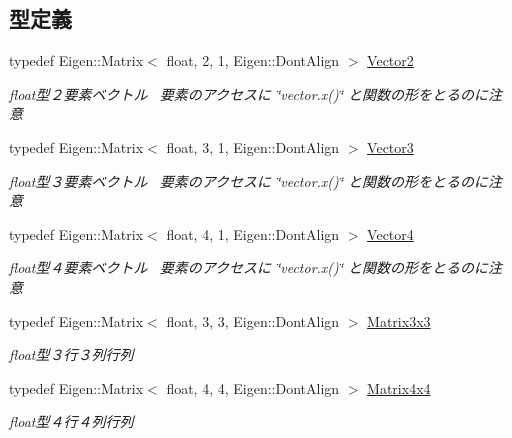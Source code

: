 \subsection*{型定義}
\begin{DoxyCompactItemize}
\item 
typedef Eigen\+::\+Matrix$<$ float, 2, 1, Eigen\+::\+Dont\+Align $>$ \mbox{\hyperlink{namespace_k___math_a41eb0c2c69c938cd59989eb3241cefb2}{Vector2}}
\begin{DoxyCompactList}\small\item\em float型２要素ベクトル~\newline
要素のアクセスに \char`\"{}vector.\+x()\char`\"{} と関数の形をとるのに注意 \end{DoxyCompactList}\item 
typedef Eigen\+::\+Matrix$<$ float, 3, 1, Eigen\+::\+Dont\+Align $>$ \mbox{\hyperlink{namespace_k___math_a66884d78082c39ada4091c211f3570f8}{Vector3}}
\begin{DoxyCompactList}\small\item\em float型３要素ベクトル~\newline
要素のアクセスに \char`\"{}vector.\+x()\char`\"{} と関数の形をとるのに注意 \end{DoxyCompactList}\item 
typedef Eigen\+::\+Matrix$<$ float, 4, 1, Eigen\+::\+Dont\+Align $>$ \mbox{\hyperlink{namespace_k___math_a8d82de9de17eae460600de1e40e8a01f}{Vector4}}
\begin{DoxyCompactList}\small\item\em float型４要素ベクトル~\newline
要素のアクセスに \char`\"{}vector.\+x()\char`\"{} と関数の形をとるのに注意 \end{DoxyCompactList}\item 
typedef Eigen\+::\+Matrix$<$ float, 3, 3, Eigen\+::\+Dont\+Align $>$ \mbox{\hyperlink{namespace_k___math_a560235ba0b8247680dfa595fc7c975dd}{Matrix3x3}}
\begin{DoxyCompactList}\small\item\em float型３行３列行列 \end{DoxyCompactList}\item 
typedef Eigen\+::\+Matrix$<$ float, 4, 4, Eigen\+::\+Dont\+Align $>$ \mbox{\hyperlink{namespace_k___math_a345271af9d32dff2c964bc679b13b45c}{Matrix4x4}}
\begin{DoxyCompactList}\small\item\em float型４行４列行列 \end{DoxyCompactList}\item 

\end{DoxyCompactItemize}
